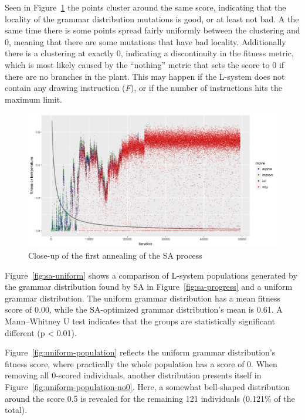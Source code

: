 Seen in Figure~\ref{fig:sa-progress-close} the points cluster around the same score, indicating that the locality of the grammar distribution mutations is good, or at least not bad.
A the same time there is some points spread fairly uniformly between the clustering and 0, meaning that there are some mutations that have bad locality.
Additionally there is a clustering at exactly 0, indicating a discontinuity in the fitness metric, which is most likely caused by the ``nothing'' metric that sets the score to 0 if there are no branches in the plant.
This may happen if the L-system does not contain any drawing instruction (\textit{F}), or if the number of instructions hits the maximum limit.

\begin{figure}
    \includegraphics[width=\textwidth]{figures/sa-progress-close}
    \caption{Close-up of the first annealing of the SA process}
    \label{fig:sa-progress-close}
\end{figure}

Figure~\ref{fig:sa-uniform} shows a comparison of L-system populations generated by the grammar distribution found by SA in Figure~\ref{fig:sa-progress} and a uniform grammar distribution.
The uniform grammar distribution has a mean fitness score of 0.00, while the SA-optimized grammar distribution's mean is 0.61.
A Mann–Whitney U test indicates that the groups are statistically significant different (p < 0.01).

Figure~\ref{fig:uniform-population} reflects the uniform grammar distribution's fitness score, where practically the whole population has a score of 0.
When removing all 0-scored individuals, another distribution presents itself in Figure~\ref{fig:uniform-population-no0}.
Here, a somewhat bell-shaped distribution around the score 0.5 is revealed for the remaining 121 individuals (0.121\% of the total).

